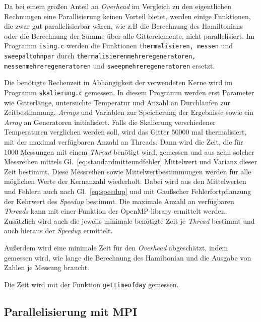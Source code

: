 	
	Da bei einem großen Anteil an \textit{Overhead} im Vergleich zu den eigentlichen Rechnungen eine Parallisierung keinen Vorteil bietet, werden einige Funktionen, die zwar gut parallelisierbar wären, wie z.B die Berechnung des Hamiltonians oder die Berechnung der Summe über alle Gitterelemente, nicht parallelisiert. Im Programm \texttt{ising.c} werden die Funktionen \texttt{thermalisieren, messen} und \texttt{sweepaltohnpar} durch \texttt{thermalisierenmehreregeneratoren, messenmehreregeneratoren} und \texttt{sweepmehreregeneratoren} ersetzt.
	
	Die benötigte Rechenzeit in Abhängigkeit der verwendeten Kerne wird im Programm \texttt{skalierung.c} gemessen. In diesem Programm werden erst Parameter wie Gitterlänge, untersuchte Temperatur und Anzahl an Durchläufen zur Zeitbestimmung, \textit{Arrays} und Variablen zur Speicherung der Ergebnisse sowie ein \textit{Array} an Generatoren initialisiert. Falls die Skalierung verschiedener Temperaturen verglichen werden soll, wird das Gitter $50000$ mal thermalisiert, mit der maximal verfügbaren Anzahl an Threads. Dann wird die Zeit, die für $\num{1000}$ Messungen mit einem \textit{Thread} benötigt wird, gemessen und aus zehn solcher Messreihen mittels Gl.~\ref{eq:standardmitteundfehler} Mittelwert und Varianz dieser Zeit bestimmt. Diese Messreihen sowie Mittelwertbestimmungen werden für alle möglichen Werte der Kernanzahl wiederholt. Dabei wird aus den Mittelwerten und Fehlern auch nach Gl.~\ref{eq:speedup} und mit Gaußscher Fehlerfortpflanzung der Kehrwert des \textit{Speedup} bestimmt. Die maximale Anzahl an verfügbaren \textit{Threads} kann mit einer Funktion der OpenMP-library ermittelt werden. 
	Zusätzlich wird auch die jeweils minimale benötigte Zeit je \textit{Thread} bestimmt und auch hieraus der \textit{Speedup} ermittelt.
	
	Außerdem wird eine minimale Zeit für den \textit{Overhead} abgeschätzt, indem gemessen wird, wie lange die Berechnung des Hamiltonian und die Ausgabe von Zahlen je Messung braucht. 
	
	Die Zeit wird mit der Funktion \texttt{gettimeofday} gemessen.
	
	\subsection{Parallelisierung mit MPI}
	\label{subsec:parmpi}
	
